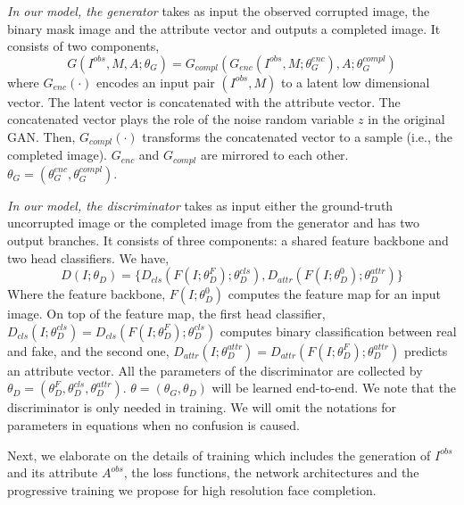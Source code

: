 \documentclass[acmtog,timestamp]{acmart}
\begin{document}
\textit{In our model, the generator} takes as input the observed corrupted image, the binary mask image and the attribute vector and outputs a completed image. It consists of two components, 
\begin{equation}
G(I^{obs}, M, A;\theta_G) = G_{compl}(G_{enc}(I^{obs}, M;\theta_G^{enc}), A; \theta_G^{compl})
\end{equation}
where $G_{enc}(\cdot)$ encodes an input pair $(I^{obs}, M)$ to a latent low dimensional vector. The latent vector is concatenated with the attribute vector. The concatenated vector plays the role of the noise random variable $z$ in the original GAN. Then, $G_{compl}(\cdot)$ transforms the concatenated vector to a sample (i.e., the completed image). $G_{enc}$ and $G_{compl}$ are mirrored to each other.  $\theta_G=(\theta_G^{enc}, \theta_G^{compl})$. 

\textit{In our model, the discriminator} takes as input either the ground-truth uncorrupted image or the completed image from the generator and has two output branches. It consists of three components: a shared feature backbone and two head classifiers. We have, 
\begin{equation}
D(I;\theta_D) = \{D_{cls}(F(I;\theta_D^F); \theta_D^{cls}), D_{attr}(F(I;\theta_D^0); \theta_D^{attr})\}
\end{equation}
Where the feature backbone,  $F(I;\theta_D^0)$  computes the feature map for an input image. On top of the feature map, the first head classifier, $D_{cls}(I; \theta_D^{cls})=D_{cls}(F(I;\theta_D^F); \theta_D^{cls})$ computes binary classification between real and fake, and the second one, $D_{attr}(I; \theta_D^{attr})=D_{attr}(F(I;\theta_D^F); \theta_D^{attr})$ predicts an attribute vector. All the parameters of the discriminator are collected by $\theta_D=(\theta_D^F, \theta_D^{cls}, \theta_D^{attr})$. $\theta=(\theta_G, \theta_D)$ will be learned end-to-end. We note that the discriminator is only needed in training. We will omit the notations for parameters in equations when no confusion is caused. 

Next, we elaborate on the details of training which includes the generation of $I^{obs}$ and its attribute $A^{obs}$, the loss functions, the network architectures and the progressive training we propose for high resolution face completion.  
\end{document}
